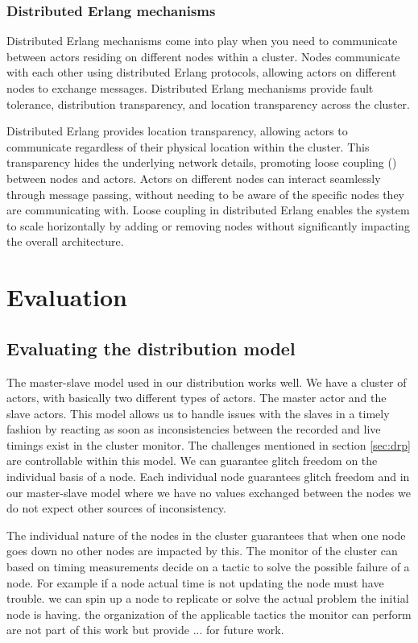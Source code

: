 \documentclass[a4paper]{book}
\begin{document}
\subsection{Distributed Erlang mechanisms}
Distributed Erlang mechanisms come into play when you need to communicate between actors residing on different nodes within a cluster.
Nodes communicate with each other using distributed Erlang protocols, allowing actors on different nodes to exchange messages. Distributed Erlang mechanisms provide fault tolerance, distribution transparency, and location transparency across the cluster. 

Distributed Erlang provides location transparency, allowing actors to communicate regardless of their physical location within the cluster. This transparency hides the underlying network details, promoting loose coupling (\cite{DBLP:conf/tools/CarretonMCM10}) between nodes and actors. Actors on different nodes can interact seamlessly through message passing, without needing to be aware of the specific nodes they are communicating with. Loose coupling in distributed Erlang enables the system to scale horizontally by adding or removing nodes without significantly impacting the overall architecture.

\chapter{Evaluation} \label{sec:evaluation}


\section{Evaluating the distribution model}

The master-slave model used in our distribution works well. We have a cluster of actors, with basically two different types of actors. The master actor and the slave actors. This model allows us to handle issues with the slaves in a timely fashion by reacting as soon as inconsistencies between the recorded and live timings exist in the cluster monitor. The challenges mentioned in section \ref{sec:drp} are controllable within this model. We can guarantee glitch freedom on the individual basis of a node. Each individual node guarantees glitch freedom and in our master-slave model where we have no values exchanged between the nodes we do not expect other sources of inconsistency. 

The individual nature of the nodes in the cluster guarantees that when one node goes down no other nodes are impacted by this. The monitor of the cluster can based on timing measurements decide on a tactic to solve the possible failure of a node. For example if a node actual time is not updating the node must have trouble. we can spin up a node to replicate or solve the actual problem the initial node is having. the organization of the applicable tactics the monitor can perform are not part of this work but provide ... for future work. 
\end{document}
